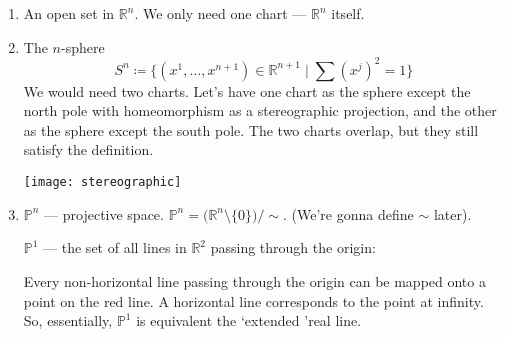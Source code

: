\begin{enumerate}
    \item {
        An open set in $\mathbb{R}^n$. We only need one chart --- $\mathbb{R}^n$ itself.
    }
    \item {
        The $n$-sphere 
        \[
             S^n \coloneqq \{ (x^1, \dots, x^{n+1}) \in \mathbb{R}^{n+1}
             \mid {\textstyle \sum} (x^j)^2 = 1 \} 
        \]
        We would need two charts. Let's have one chart as
        the sphere except the north pole with homeomorphism as a stereographic projection,
        and the other as the sphere except the south pole.
        The two charts overlap, but they still satisfy the definition.

        \begin{figure*}[h]
            \centering
            \texttt{[image: stereographic]}
        \end{figure*}
    }
    \item {
        $\mathbb{P}^n$ --- projective space.
        $\mathbb{P}^n = \bigl(\mathbb{R}^n \setminus \{0\} \bigr) / \sim$.
        (We're gonna define $\sim$ later).

        $\mathbb{P}^1$ --- the set of all lines in $\mathbb{R}^2$ passing through
        the origin:
        \begin{center}   
        \end{center}
        Every non-horizontal line passing through the origin can be mapped onto 
        a point on the red line. A horizontal line corresponds to the 
        point at infinity. So, essentially, $\mathbb{P}^1$ 
        is equivalent the `extended 'real line. 

}
\end{enumerate}
